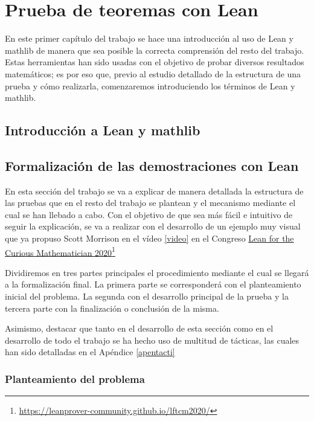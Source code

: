 \chapter{Prueba de teoremas con Lean}

En este primer capítulo del trabajo se hace una introducción al uso de
Lean y mathlib de manera que sea posible la correcta comprensión del
resto del trabajo. Estas herramientas han sido usadas con el objetivo de
probar diversos resultados matemáticos; es por eso que, previo al
estudio detallado de la estructura de una prueba y cómo realizarla,
comenzaremos introduciendo los términos de Lean y mathlib.

\section{Introducción a Lean y mathlib}

\section{Formalización de las demostraciones con Lean}

En esta sección del trabajo se va a explicar de manera detallada la
estructura de las pruebas que en el resto del trabajo se plantean y el
mecanismo mediante el cual se han llebado a cabo. Con el objetivo de que
sea más fácil e intuitivo de seguir la explicación, se va a realizar con
el desarrollo de un ejemplo muy visual que ya propuso Scott Morrison en
el vídeo \ref{video} en el Congreso
\href{https://leanprover-community.github.io/lftcm2020/}
     {Lean for the Curious Mathematician 2020}\footnote{\url{https://leanprover-community.github.io/lftcm2020/}}

Dividiremos en tres partes principales el procedimiento mediante el
cual se llegará a la formalización final. La primera parte se
corresponderá con el planteamiento inicial del problema. La segunda
con el desarrollo principal de la prueba y la tercera parte con la
finalización o conclusión de la misma.

Asimismo, destacar que tanto en el desarrollo de esta sección como en el
desarrollo de todo el trabajo se ha hecho uso de multitud de tácticas, las
cuales han sido detalladas en el Apéndice \ref{apentacti}

\subsection{Planteamiento del problema}

